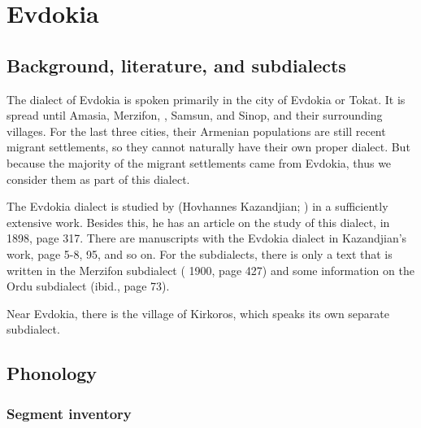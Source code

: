\chapter{Evdokia} \label{chapter:Evdokia}
\section{Background, literature, and subdialects}

\begin{adjarianpage}\label{page:232}\end{adjarianpage}%

The dialect of Evdokia is spoken primarily in the city of Evdokia or Tokat. It is spread until Amasia, Merzifon, , Samsun, and Sinop, and their surrounding villages. For the last three cities, their Armenian populations are still recent migrant settlements, so they cannot naturally have their own proper dialect. But because the majority of the migrant settlements came from Evdokia, thus we consider them as part of this dialect. 



The Evdokia dialect is studied by \citet{KazandjianBook} (Hovhannes Kazandjian;  ) in a sufficiently extensive work. Besides this, he has an article on the study of this dialect, in  1898, page 317. There are manuscripts with the Evdokia dialect in Kazandjian's work, page 5-8, 95, and so on. For the subdialects, there is only a text that is written in the Merzifon subdialect ( 1900, page 427) and some information on the Ordu subdialect (ibid., page 73). 

Near Evdokia, there is the village of Kirkoros, which speaks its own separate subdialect. 



\section{Phonology}

\subsection{Segment inventory}

